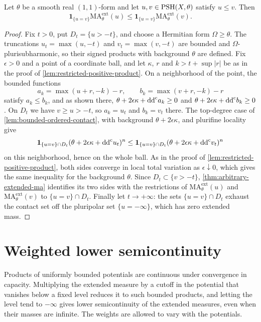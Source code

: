\begin{proposition}\label{prop:ordered-contact-general}
Let $\theta$ be a smooth real $(1,1)$-form and let $u,v\in\mathrm{PSH}(X,\theta)$ satisfy $u\leq v$. Then
\[
 \mathbf1_{\{u=v\}}\mathrm{MA}^{\mathrm{ext}}_\theta(u)
 \leq\mathbf1_{\{u=v\}}\mathrm{MA}^{\mathrm{ext}}_\theta(v).
\]
\end{proposition}
\begin{proof}
Fix $t>0$, put $D_t=\{u>-t\}$, and choose a Hermitian form $\Omega\geq\theta$. The truncations $u_t=\max(u,-t)$ and $v_t=\max(v,-t)$ are bounded and $\Omega$-plurisubharmonic, so their signed products with background $\theta$ are defined. Fix $\epsilon>0$ and a point of a coordinate ball, and let $\kappa$, $r$ and $k>t+\sup|r|$ be as in the proof of \cref{lem:restricted-positive-product}. On a neighborhood of the point, the bounded functions
\[
 a_k=\max(u+r,-k)-r,\qquad
 b_k=\max(v+r,-k)-r
\]
satisfy $a_k\leq b_k$, and as shown there, $\theta+2\epsilon\kappa+\mathrm{dd}^{\mathrm{c}} a_k\geq0$ and $\theta+2\epsilon\kappa+\mathrm{dd}^{\mathrm{c}} b_k\geq0$. On $D_t$ we have $v\geq u>-t$, so $a_k=u_t$ and $b_k=v_t$ there. The top-degree case of \cref{lem:bounded-ordered-contact}, with background $\theta+2\epsilon\kappa$, and plurifine locality give
\[
 \mathbf1_{\{u=v\}\cap D_t}(\theta+2\epsilon\kappa+\mathrm{dd}^{\mathrm{c}} u_t)^n
 \leq\mathbf1_{\{u=v\}\cap D_t}(\theta+2\epsilon\kappa+\mathrm{dd}^{\mathrm{c}} v_t)^n
\]
on this neighborhood, hence on the whole ball. As in the proof of \cref{lem:restricted-positive-product}, both sides converge in local total variation as $\epsilon\downarrow0$, which gives the same inequality for the background $\theta$. Since $D_t\subset\{v>-t\}$, \cref{thm:arbitrary-extended-ma} identifies its two sides with the restrictions of $\mathrm{MA}^{\mathrm{ext}}_\theta(u)$ and $\mathrm{MA}^{\mathrm{ext}}_\theta(v)$ to $\{u=v\}\cap D_t$. Finally let $t\to+\infty$: the sets $\{u=v\}\cap D_t$ exhaust the contact set off the pluripolar set $\{u=-\infty\}$, which has zero extended mass.
\end{proof}

\section{Weighted lower semicontinuity}

Products of uniformly bounded potentials are continuous under convergence in capacity. Multiplying the extended measure by a cutoff in the potential that vanishes below a fixed level reduces it to such bounded products, and letting the level tend to $-\infty$ gives lower semicontinuity of the extended measures, even when their masses are infinite. The weights are allowed to vary with the potentials.

